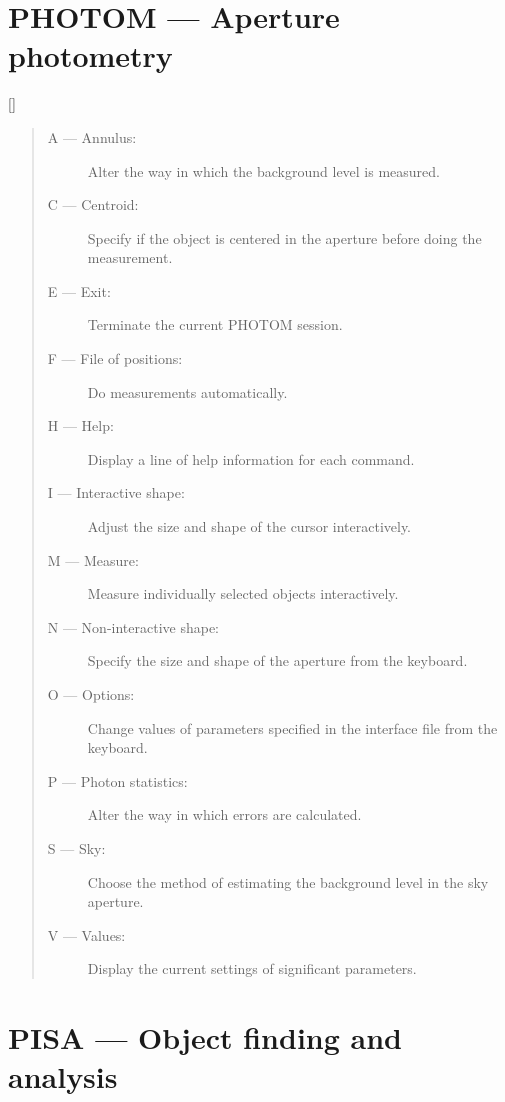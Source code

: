 \newpage

\section{PHOTOM --- Aperture photometry}

\vspace{-10mm}

\hfill []

\vspace{2mm}

\begin{quote}
\begin{description}
\item [A --- Annulus:] 
 Alter the way in which the background level is measured.
\item [C --- Centroid:] 
 Specify if the object is centered in the aperture before doing the measurement.
\item [E --- Exit:] 
 Terminate the current PHOTOM session.
\item [F --- File of positions:] 
 Do measurements automatically.
\item [H --- Help:] 
 Display a line of help information for each command.
\item [I --- Interactive shape:] 
 Adjust the size and shape of the cursor interactively.
\item [M --- Measure:] 
 Measure individually selected objects interactively.
\item [N --- Non-interactive shape:] 
 Specify the size and shape of the aperture from the keyboard.
\item [O --- Options:] 
 Change values of parameters specified in the interface file from the keyboard.
\item [P --- Photon statistics:] 
 Alter the way in which errors are calculated.
\item [S --- Sky:] 
 Choose the method of estimating the background level in the sky aperture.
\item [V --- Values:] 
 Display the current settings of significant parameters.
\end{description}
\end{quote}

\newpage

\section{PISA --- Object finding and analysis}

